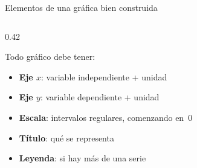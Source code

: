 \documentclass[aspectratio=169, 10pt, spanish]{beamer}
\begin{document}
\begin{frame}{Elementos de una gráfica bien construida}
\begin{columns}[T]
\begin{column}{0.42\textwidth}
\begin{teoriabox}
        \AlmFontSmall
        Todo gráfico debe tener:
        \begin{itemize}
          \item \textbf{Eje $x$}: variable independiente + unidad
          \item \textbf{Eje $y$}: variable dependiente + unidad
          \item \textbf{Escala}: intervalos regulares, comenzando en~0
          \item \textbf{Título}: qué se representa
          \item \textbf{Leyenda}: si hay más de una serie
        \end{itemize}
      \end{teoriabox}
    \end{column}
  \end{columns}
\end{frame}
\end{document}

